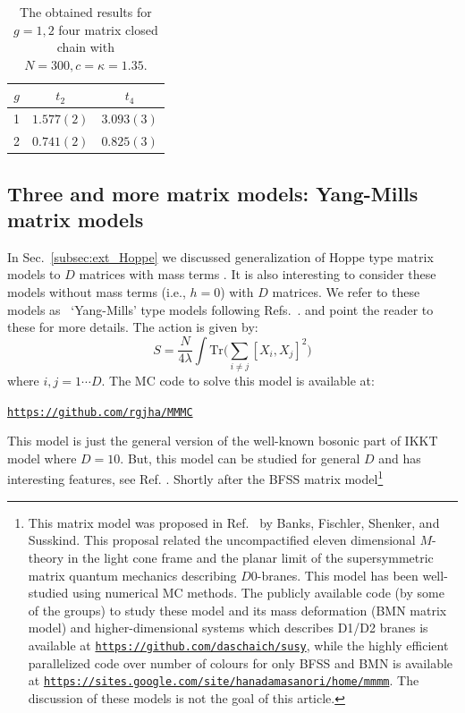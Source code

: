 \documentclass[11pt]{article}
\begin{document}
\begin{table}[h!]
	\centering
	\begin{tabular}{||c c c||} 
		\hline
		$g$ & $ t_2 $ & $t_4 $ \\ [0.5ex] 
		\hline\hline
		1 & $ 1.577(2) $ & $3.093(3)$ \\
		2 & $ 0.741(2)$ & $0.825(3) $  
		\\ [1ex] 
		\hline 
	\end{tabular}
	\caption{The obtained results for $g=1,2$ four matrix closed chain with $N=300, c=\kappa=1.35$.}
	\label{table:4mchain_data}
\end{table}


\subsection{Three and more matrix models: Yang-Mills matrix models}
In Sec.~\ref{subsec:ext_Hoppe} we discussed generalization of Hoppe type matrix models to $D$ matrices
with mass terms . It is also interesting to consider these models without mass terms (i.e., $h=0$) with $D$ matrices. 
We refer to these models as ~`Yang-Mills' type models following Refs.~\cite{Krauth:1998yu,Krauth:1999qw}. 
and point the reader to these for more details. The action is given by: 
\begin{equation}
	\label{eq:CTmodel} 
S = \frac{N}{4\lambda} \int \mbox{Tr} \Bigg( \sum_{i \neq j}[X_i, X_j]^{2}\Bigg) 
\end{equation}
where $i, j = 1 \cdots D$. The MC code to solve this model is available at:
\begin{center} \texttt{\href{https://github.com/rgjha/MMMC}{https://github.com/rgjha/MMMC}} \end{center}
This model is just the general version of the well-known bosonic part of IKKT model
where $D=10$. But, this model can be studied for general $D$ and has interesting features, see Ref. \cite{Hotta:1998en}. 
Shortly after the BFSS matrix model\footnote{This matrix model was proposed in Ref.~\cite{Banks:1996vh} by
Banks, Fischler, Shenker, and Susskind. This proposal related the 
uncompactified eleven dimensional $M$-theory in the light cone frame and the 
planar limit of the supersymmetric matrix quantum mechanics describing $D0$-branes. This model has been
well-studied using numerical MC methods\cite{Catterall:2007fp,Hanada:2008ez,Filev:2015hia,Berkowitz:2016tyy}. The publicly available code (by some of the groups) to study these model and its mass deformation (BMN matrix model) and higher-dimensional systems which describes D1/D2 branes 
\cite{Catterall:2017lub,Jha:2017zad,Catterall:2020nmn}
is available at \texttt{\href{https://github.com/daschaich/susy}{https://github.com/daschaich/susy}}, while the
highly efficient parallelized code over number of colours for only BFSS and BMN is available at
\texttt{\href{https://sites.google.com/site/hanadamasanori/home/mmmm}
{https://sites.google.com/site/hanadamasanori/home/mmmm}}.
The discussion of these models is not the goal of this article. 
}
\end{document}
